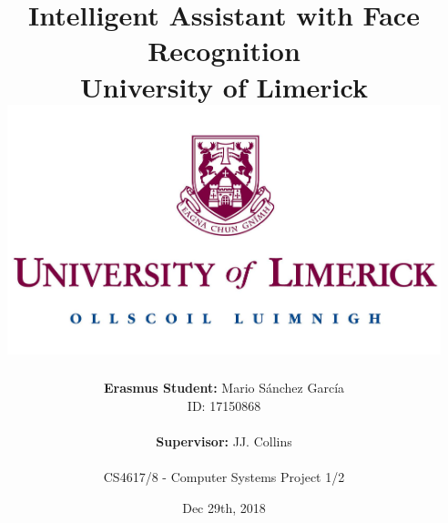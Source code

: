 \documentclass[a4paper,12pt,fleqn]{report}
\title{
	{Intelligent Assistant with Face Recognition}\\
	{\large University of Limerick}\\
	{\includegraphics[max width=126mm]{university.jpg}}
	\vspace{0.8cm}
}
\author{
	\textbf{Erasmus Student:} Mario Sánchez García\\
	ID: 17150868\\
	\\
	\textbf{Supervisor:} JJ. Collins\\
	\\
	CS4617/8 - Computer Systems Project 1/2
}
\date{Dec 29th, 2018}
\def \chapterspath {./chapters}
\begin{document}
\maketitle
\vfill



%
%
\tableofcontents

%
%

%
%



%

%

%

  
\end{document}
